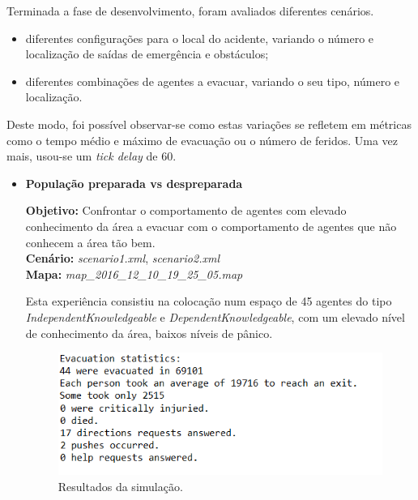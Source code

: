 \documentclass[12pt]{article}
\begin{document}
\begin{titlepage}
\begin{itemize}
\end{itemize}


Terminada a fase de desenvolvimento, foram avaliados diferentes cenários.
\begin{itemize}
	\item diferentes configurações para o local do acidente, variando o número e localização de saídas de emergência e obstáculos;
	\item diferentes combinações de agentes a evacuar, variando o seu tipo, número e localização.
\end{itemize}

Deste modo, foi possível observar-se como estas variações se refletem em métricas como o tempo médio e máximo de evacuação ou o número de feridos. Uma vez mais, usou-se um \textit{tick delay} de 60.

\begin{itemize}
	\item \textbf{População preparada vs despreparada}

\textbf{Objetivo:} 
Confrontar o comportamento de agentes com elevado conhecimento da área a evacuar com o comportamento de agentes que não conhecem a área tão bem.
\\\textbf{Cenário:} 
\textit{scenario1.xml}, \textit{scenario2.xml}
\\\textbf{Mapa:} 
\textit{map\_2016\_12\_10\_19\_25\_05.map}
\newline


Esta experiência consistiu na colocação num espaço de 45 agentes do tipo \textit{IndependentKnowledgeable} e \textit{DependentKnowledgeable}, com um elevado nível de conhecimento da área, baixos níveis de pânico.

\begin{figure}[H]
	\centering
	\includegraphics{log_sc1.png}
	\caption{Resultados da simulação.}
	\label{log_sc1}
\end{figure}


\end{itemize}
\end{titlepage}
\end{document}
